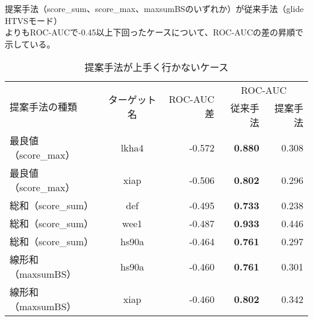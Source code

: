 \begin{table}[htb] \centering
	\caption{提案手法が上手く行かないケース}
	\label{table:target_accuracy_bad}
	提案手法（score\_sum、score\_max、maxsumBSのいずれか）が従来手法（glide HTVSモード）\\
	よりもROC-AUCで-0.45以上下回ったケースについて、ROC-AUCの差の昇順で示している。
	\begin{tabular}{lc|r|rr}
	\hline
	\multirow{2}{*}{提案手法の種類}	&\multirow{2}{*}{ターゲット名}	&\multirow{2}{*}{ROC-AUC差}	&\multicolumn{2}{c}{ROC-AUC}	\\
								&						&							&従来手法	&提案手法		\\ \hline
	最良値（score\_max）			&lkha4					&-0.572						&{\bf 0.880}	&0.308			\\
	最良値（score\_max）			&xiap					&-0.506						&{\bf 0.802}	&0.296			\\
	総和（score\_sum）				&def						&-0.495						&{\bf 0.733}	&0.238			\\
	総和（score\_sum）				&wee1					&-0.487						&{\bf 0.933}	&0.446			\\
	総和（score\_sum）				&hs90a					&-0.464						&{\bf 0.761}	&0.297			\\
	線形和（maxsumBS）			&hs90a					&-0.460						&{\bf 0.761}	&0.301			\\
	線形和（maxsumBS）			&xiap					&-0.460						&{\bf 0.802}	&0.342			\\ \hline
	\end{tabular}
\end{table}


